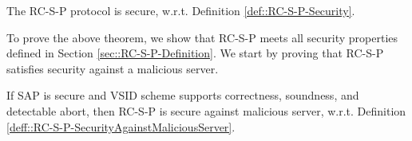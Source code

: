 \begin{theorem}
The RC-S-P protocol is secure, w.r.t. Definition \ref{def::RC-S-P-Security}. 
\end{theorem}



 To prove the above theorem, we show that RC-S-P meets all security properties defined in Section \ref{sec::RC-S-P-Definition}.  We start by proving that RC-S-P satisfies security against a malicious server.  
 
 \begin{lemma}
 If SAP is secure and  VSID scheme supports correctness, soundness, and detectable abort, then RC-S-P is secure against malicious server, w.r.t. Definition \ref{deff::RC-S-P-SecurityAgainstMaliciousServer}. 
 \end{lemma}
 
 
 
